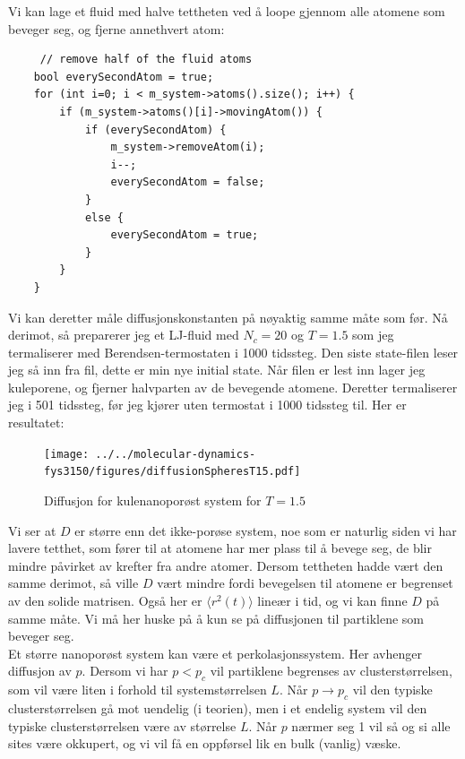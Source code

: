 \documentclass[english, a4paper]{article}
\begin{document}
\noindent
Vi kan lage et fluid med halve tettheten ved å loope gjennom alle atomene som beveger seg, og
fjerne annethvert atom:
\begin{lstlisting}
     // remove half of the fluid atoms
    bool everySecondAtom = true;
    for (int i=0; i < m_system->atoms().size(); i++) {
        if (m_system->atoms()[i]->movingAtom()) {
            if (everySecondAtom) {
                m_system->removeAtom(i);
                i--;
                everySecondAtom = false;
            }
            else {
                everySecondAtom = true;
            }
        }
    }
\end{lstlisting}
Vi kan deretter måle diffusjonskonstanten på nøyaktig samme måte som før. Nå derimot, så preparerer
jeg et LJ-fluid med $N_c = 20$ og $T = 1.5$ som jeg termaliserer med Berendsen-termostaten i 1000 tidssteg.
Den siste state-filen leser jeg så inn fra fil, dette er min nye initial state. Når filen er lest inn 
lager jeg kuleporene, og fjerner halvparten av de bevegende atomene. Deretter termaliserer jeg i 501
tidssteg, før jeg kjører uten termostat i 1000 tidssteg til. Her er resultatet:
\begin{figure}[H]
  \begin{center}
  \texttt{[image: ../../molecular-dynamics-fys3150/figures/diffusionSpheresT15.pdf]}
  \caption{Diffusjon for kulenanoporøst system for $T=1.5$}
  \label{fig:fig7}
  \end{center}
\end{figure}
Vi ser at $D$ er større enn det ikke-porøse system, noe som er naturlig siden vi har lavere tetthet, som 
fører til at atomene har mer plass til å bevege seg, de blir mindre påvirket av krefter fra andre atomer. 
Dersom tettheten hadde vært den samme derimot, så ville $D$ vært mindre fordi bevegelsen til atomene 
er begrenset av den solide matrisen. 
Også her er $\langle r^2(t) \rangle$ lineær i tid, og vi kan finne $D$ på samme måte. Vi må her huske på
å kun se på diffusjonen til partiklene som beveger seg. \\

\noindent
Et større nanoporøst system kan være et perkolasjonssystem. Her avhenger diffusjon av $p$. 
Dersom vi har $p < p_c$ vil partiklene begrenses av clusterstørrelsen, som vil være liten 
i forhold til systemstørrelsen $L$. Når $p \to p_c$ vil den typiske clusterstørrelsen gå mot uendelig 
(i teorien), men i et endelig system vil den typiske clusterstørrelsen være av størrelse $L$. 
Når $p$ nærmer seg 1 vil så og si alle sites være okkupert, og vi vil få en oppførsel lik 
en bulk (vanlig) væske. 
\end{document}
